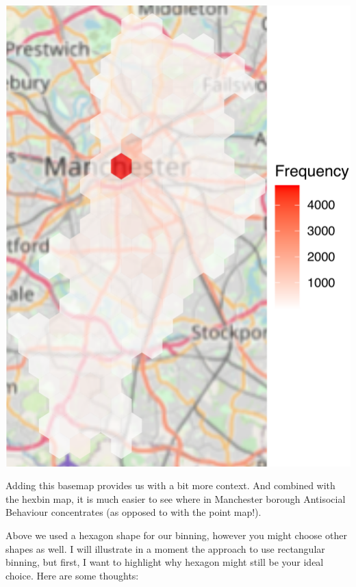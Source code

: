 \documentclass[
]{book}
\begin{document}
\includegraphics{crime_mapping_files/figure-latex/unnamed-chunk-126-1.pdf}

Adding this basemap provides us with a bit more context. And combined with the hexbin map, it is much easier to see where in Manchester borough Antisocial Behaviour concentrates (as opposed to with the point map!).

Above we used a hexagon shape for our binning, however you might choose other shapes as well. I will illustrate in a moment the approach to use rectangular binning, but first, I want to highlight why hexagon might still be your ideal choice. Here are some thoughts:
\end{document}
